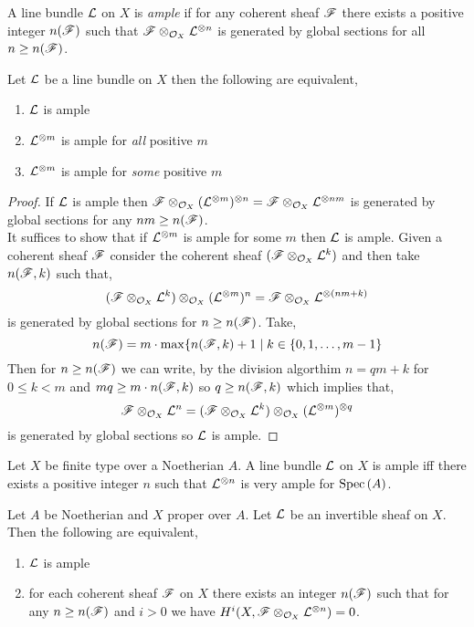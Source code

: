 \documentclass[12pt]{article}
\begin{document}
\begin{definition}
A line bundle $\mathcal{L}$ on $X$ is \textit{ample} if for any coherent sheaf $\mathscr{F}$ there exists a positive integer $n(\mathscr{F})$ such that $\mathscr{F} \otimes_{\mathcal{O}_{X}} \mathcal{L}^{\otimes n}$ is generated by global sections for all $n \ge n(\mathscr{F})$.
\end{definition}

\begin{proposition}
Let $\mathcal{L}$ be a line bundle on $X$ then the following are equivalent,
\begin{enumerate}
\item $\mathcal{L}$ is ample
\item $\mathcal{L}^{\otimes m}$ is ample for \textit{all} positive $m$
\item $\mathcal{L}^{\otimes m}$ is ample for \textit{some} positive $m$
\end{enumerate}
\end{proposition}

\begin{proof}
If $\mathcal{L}$ is ample then $\mathscr{F} \otimes_{\mathcal{O}_{X}} (\mathcal{L}^{\otimes m})^{\otimes n} = \mathscr{F} \otimes_{\mathcal{O}_{X}} \mathcal{L}^{\otimes n m}$ is generated by global sections for any $nm \ge n(\mathscr{F})$. 
\bigskip\\
It suffices to show that if $\mathcal{L}^{\otimes m}$ is ample for some $m$ then $\mathcal{L}$ is ample. Given a coherent sheaf $\mathscr{F}$ consider the coherent sheaf $(\mathscr{F} \otimes_{\mathcal{O}_{X}} \mathcal{L}^k)$ and then take $n(\mathscr{F}, k)$ such that,
\[ (\mathscr{F} \otimes_{\mathcal{O}_{X}} \mathcal{L}^k) \otimes_{\mathcal{O}_{X}} (\mathcal{L}^{\otimes m})^n = \mathscr{F} \otimes_{\mathcal{O}_{X}} \mathcal{L}^{\otimes (nm + k)} \]
is generated by global sections for $n \ge n(\mathscr{F})$. Take,
\[ n(\mathscr{F}) = m \cdot \max\{ n(\mathscr{F}, k) + 1 \mid k \in \{ 0, 1, \dots, m - 1 \} \] Then for $n \ge n(\mathscr{F})$ we can write, by the division algorthim $n = q m + k$ for $0 \le k < m$ and $m q \ge m \cdot n(\mathscr{F}, k)$ so $q \ge n(\mathscr{F}, k)$ which implies that,
\[ \mathscr{F} \otimes_{\mathcal{O}_{X}} \mathcal{L}^n = (\mathscr{F} \otimes_{\mathcal{O}_{X}} \mathcal{L}^k) \otimes_{\mathcal{O}_{X}} (\mathcal{L}^{\otimes m})^{\otimes q} \]
is generated by global sections so $\mathcal{L}$ is ample. 
\end{proof}

\begin{theorem}
Let $X$ be finite type over a Noetherian $A$. A line bundle $\mathcal{L}$ on $X$ is ample iff there exists a positive integer $n$ such that $\mathcal{L}^{\otimes n}$ is very ample for $\mathrm{Spec}\left( A \right)$. 
\end{theorem}

\begin{theorem}[Serre]
Let $A$ be Noetherian and $X$ proper over $A$. Let $\mathcal{L}$ be an invertible sheaf on $X$. Then the following are equivalent,
\begin{enumerate}
\item $\mathcal{L}$ is ample
\item for each coherent sheaf $\mathscr{F}$ on $X$ there exists an integer $n(\mathscr{F})$ such that for any $n \ge n(\mathscr{F})$ and $i > 0$ we have $H^i(X, \mathscr{F} \otimes_{\mathcal{O}_{X}} \mathcal{L}^{\otimes n}) = 0$.
\end{enumerate}
\end{theorem}
\end{document}
